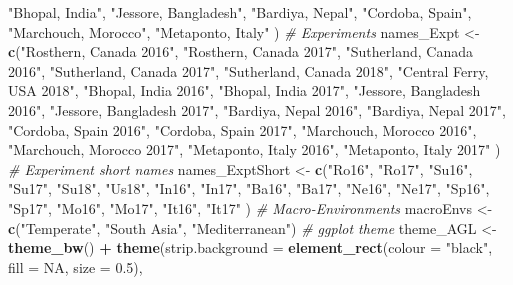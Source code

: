 \documentclass[
]{article}
\newenvironment{Shaded}{\begin{snugshade}}{\end{snugshade}}
\newcommand{\CommentTok}[1]{\textcolor[rgb]{0.56,0.35,0.01}{\textit{#1}}}
\newcommand{\DataTypeTok}[1]{\textcolor[rgb]{0.13,0.29,0.53}{#1}}
\newcommand{\FloatTok}[1]{\textcolor[rgb]{0.00,0.00,0.81}{#1}}
\newcommand{\KeywordTok}[1]{\textcolor[rgb]{0.13,0.29,0.53}{\textbf{#1}}}
\newcommand{\NormalTok}[1]{#1}
\newcommand{\OperatorTok}[1]{\textcolor[rgb]{0.81,0.36,0.00}{\textbf{#1}}}
\newcommand{\OtherTok}[1]{\textcolor[rgb]{0.56,0.35,0.01}{#1}}
\newcommand{\StringTok}[1]{\textcolor[rgb]{0.31,0.60,0.02}{#1}}
\begin{document}
\begin{Shaded}
\begin{Highlighting}[]
                    \StringTok{"Bhopal, India"}\NormalTok{,    }\StringTok{"Jessore, Bangladesh"}\NormalTok{, }\StringTok{"Bardiya, Nepal"}\NormalTok{,}
                    \StringTok{"Cordoba, Spain"}\NormalTok{,   }\StringTok{"Marchouch, Morocco"}\NormalTok{,  }\StringTok{"Metaponto, Italy"}\NormalTok{ )}
\CommentTok{# Experiments}
\NormalTok{names_Expt <-}\StringTok{ }\KeywordTok{c}\NormalTok{(}\StringTok{"Rosthern, Canada 2016"}\NormalTok{,    }\StringTok{"Rosthern, Canada 2017"}\NormalTok{,}
                \StringTok{"Sutherland, Canada 2016"}\NormalTok{,  }\StringTok{"Sutherland, Canada 2017"}\NormalTok{, }
                \StringTok{"Sutherland, Canada 2018"}\NormalTok{,  }\StringTok{"Central Ferry, USA 2018"}\NormalTok{,}
                \StringTok{"Bhopal, India 2016"}\NormalTok{,       }\StringTok{"Bhopal, India 2017"}\NormalTok{,}
                \StringTok{"Jessore, Bangladesh 2016"}\NormalTok{, }\StringTok{"Jessore, Bangladesh 2017"}\NormalTok{,}
                \StringTok{"Bardiya, Nepal 2016"}\NormalTok{,      }\StringTok{"Bardiya, Nepal 2017"}\NormalTok{,}
                \StringTok{"Cordoba, Spain 2016"}\NormalTok{,      }\StringTok{"Cordoba, Spain 2017"}\NormalTok{,}
                \StringTok{"Marchouch, Morocco 2016"}\NormalTok{,  }\StringTok{"Marchouch, Morocco 2017"}\NormalTok{,}
                \StringTok{"Metaponto, Italy 2016"}\NormalTok{,    }\StringTok{"Metaponto, Italy 2017"}\NormalTok{ )}
\CommentTok{# Experiment short names}
\NormalTok{names_ExptShort <-}\StringTok{ }\KeywordTok{c}\NormalTok{(}\StringTok{"Ro16"}\NormalTok{, }\StringTok{"Ro17"}\NormalTok{, }\StringTok{"Su16"}\NormalTok{, }\StringTok{"Su17"}\NormalTok{, }\StringTok{"Su18"}\NormalTok{, }\StringTok{"Us18"}\NormalTok{,}
                     \StringTok{"In16"}\NormalTok{, }\StringTok{"In17"}\NormalTok{, }\StringTok{"Ba16"}\NormalTok{, }\StringTok{"Ba17"}\NormalTok{, }\StringTok{"Ne16"}\NormalTok{, }\StringTok{"Ne17"}\NormalTok{, }
                     \StringTok{"Sp16"}\NormalTok{, }\StringTok{"Sp17"}\NormalTok{, }\StringTok{"Mo16"}\NormalTok{, }\StringTok{"Mo17"}\NormalTok{, }\StringTok{"It16"}\NormalTok{, }\StringTok{"It17"}\NormalTok{ )}
\CommentTok{# Macro-Environments}
\NormalTok{macroEnvs <-}\StringTok{ }\KeywordTok{c}\NormalTok{(}\StringTok{"Temperate"}\NormalTok{, }\StringTok{"South Asia"}\NormalTok{, }\StringTok{"Mediterranean"}\NormalTok{)}
\CommentTok{# ggplot theme}
\NormalTok{theme_AGL <-}\StringTok{ }\KeywordTok{theme_bw}\NormalTok{() }\OperatorTok{+}\StringTok{ }
\StringTok{  }\KeywordTok{theme}\NormalTok{(}\DataTypeTok{strip.background =} \KeywordTok{element_rect}\NormalTok{(}\DataTypeTok{colour =} \StringTok{"black"}\NormalTok{, }\DataTypeTok{fill =} \OtherTok{NA}\NormalTok{, }\DataTypeTok{size =} \FloatTok{0.5}\NormalTok{),}

\end{Highlighting}
\end{Shaded}
\end{document}
